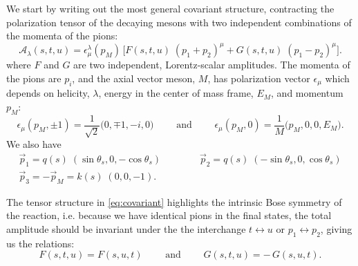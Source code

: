 \documentclass[10pt, aps,prd,amsmath,amssymb,superscriptaddress,onecolumn,
nofootinbib,showpacs,preprintnumbers]{revtex4-1}
\begin{document}
   We start by writing out the most general covariant structure, contracting the polarization tensor of the decaying mesons with two independent combinations of the momenta of the pions:
   \begin{equation}
     \label{eq:covariant}
     \mathcal{A}_\lambda(s,t,u) = \epsilon_\mu^\lambda(p_M) \, \bigg[ F(s,t,u) \; (p_1 + p_2)^\mu + G(s,t,u) \;  (p_1 - p_2)^\mu \bigg].
     \end{equation}
 where \(F\) and \(G\) are two independent, Lorentz-scalar amplitudes. The momenta of the pions are \(p_i\), and the axial vector meson, \(M\), has polarization vector \(\epsilon_\mu\) which depends on helicity, \(\lambda\), energy in the center of mass frame, \(E_M\), and momentum \(p_M\):
   \begin{equation}
     \label{eq:polarization}
     \epsilon_\mu(p_M, \pm1) = \frac{1}{\sqrt{2}} \big( 0, \mp 1, - i, 0 \big) \qquad \text{ and } \qquad \epsilon_\mu(p_M, 0) = \frac{1}{M} \big( p_M, 0, 0, E_M \big).
     \end{equation}
 We also have
   \begin{gather}
     \vec{p}_1 = q(s) \; (\sin \theta_s, 0,  -\cos \theta_s) \qquad \qquad \vec{p}_2 = q(s) \; (-\sin \theta_s, 0 , \cos \theta_s ) \\
     \vec{p}_3 = - \vec{p}_M = k(s) \; (0,0,-1). \nonumber
   \end{gather}

 The  tensor structure in \cref{eq:covariant} highlights the intrinsic Bose symmetry of the reaction, i.e. because we have identical pions in the final states, the total amplitude should be invariant under the the interchange \(t \leftrightarrow u \) or \(p_1 \leftrightarrow p_2\), giving us the relations:
   \begin{equation}
     F(s,t,u) = F(s,u,t) \qquad \text{ and } \qquad G(s,t,u) = - \, G(s,u,t).
   \end{equation}
\end{document}
